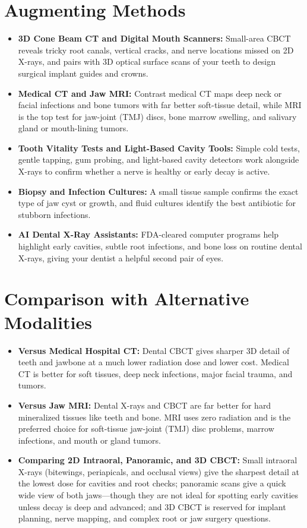 \section{Augmenting Methods}
\begin{itemize}
\item \textbf{3D Cone Beam CT and Digital Mouth Scanners:} Small-area CBCT reveals tricky root canals, vertical cracks, and nerve locations missed on 2D X-rays, and pairs with 3D optical surface scans of your teeth to design surgical implant guides and crowns.
\item \textbf{Medical CT and Jaw MRI:} Contrast medical CT maps deep neck or facial infections and bone tumors with far better soft-tissue detail, while MRI is the top test for jaw-joint (TMJ) discs, bone marrow swelling, and salivary gland or mouth-lining tumors.
\item \textbf{Tooth Vitality Tests and Light-Based Cavity Tools:} Simple cold tests, gentle tapping, gum probing, and light-based cavity detectors work alongside X-rays to confirm whether a nerve is healthy or early decay is active.
\item \textbf{Biopsy and Infection Cultures:} A small tissue sample confirms the exact type of jaw cyst or growth, and fluid cultures identify the best antibiotic for stubborn infections.
\item \textbf{AI Dental X-Ray Assistants:} FDA-cleared computer programs help highlight early cavities, subtle root infections, and bone loss on routine dental X-rays, giving your dentist a helpful second pair of eyes.
\end{itemize}

\section{Comparison with Alternative Modalities}
\begin{itemize}
\item \textbf{Versus Medical Hospital CT:} Dental CBCT gives sharper 3D detail of teeth and jawbone at a much lower radiation dose and lower cost. Medical CT is better for soft tissues, deep neck infections, major facial trauma, and tumors.
\item \textbf{Versus Jaw MRI:} Dental X-rays and CBCT are far better for hard mineralized tissues like teeth and bone. MRI uses zero radiation and is the preferred choice for soft-tissue jaw-joint (TMJ) disc problems, marrow infections, and mouth or gland tumors.
\item \textbf{Comparing 2D Intraoral, Panoramic, and 3D CBCT:} Small intraoral X-rays (bitewings, periapicals, and occlusal views) give the sharpest detail at the lowest dose for cavities and root checks; panoramic scans give a quick wide view of both jaws---though they are not ideal for spotting early cavities unless decay is deep and advanced; and 3D CBCT is reserved for implant planning, nerve mapping, and complex root or jaw surgery questions.
\end{itemize}

